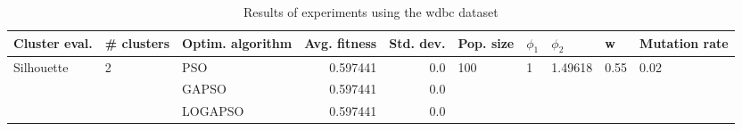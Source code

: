 \begin{table}
\centering
\caption{Results of experiments using the wdbc dataset}
\begin{tabular}{lllrrlllll}
\toprule
              Cluster eval. &        \# clusters & Optim. algorithm &  Avg. fitness &  Std. dev. &            Pop. size &         $\phi_{1}$ &               $\phi_{2}$ &                     w &         Mutation rate \\
\midrule
\multirow{3}{*}{Silhouette} & \multirow{3}{*}{2} &              PSO &      0.597441 &        0.0 & \multirow{3}{*}{100} & \multirow{3}{*}{1} & \multirow{3}{*}{1.49618} & \multirow{3}{*}{0.55} & \multirow{3}{*}{0.02} \\
                            &                    &            GAPSO &      0.597441 &        0.0 &                      &                    &                          &                       &                       \\
                            &                    &          LOGAPSO &      0.597441 &        0.0 &                      &                    &                          &                       &                       \\
\bottomrule
\end{tabular}
\end{table}
